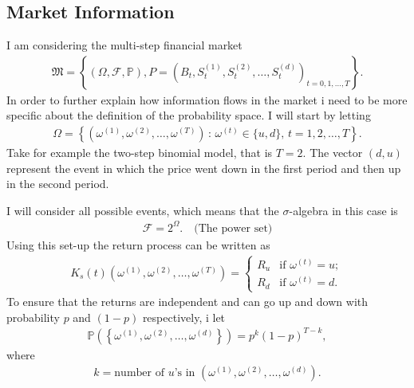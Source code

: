 \documentclass{article}
\theoremstyle{definition}
\numberwithin{equation}{section}
\begin{document}
\subsection{Market Information}
I am considering the multi-step financial market
\begin{align}
    \mathfrak{M} = \left\{
        (\Omega, \mathscr{F}, \mathbb{P}),
        P = \left(
            B_t, S_t^{(1)}, S_t^{(2)}, \ldots, S_t^{(d)}
        \right)_{t = 0,1, \ldots, T}
    \right\}.
\end{align}
In order to further explain how information flows in the market i need to be more specific about the definition of the probability space.
I will start by letting
\begin{align}
    \Omega = \left\{
        \left(
            \omega^{(1)}, \omega^{(2)}, \ldots, \omega^{(T)}
        \right)
        \, : \,
        \omega^{(t)} \in \{u,d\}, \, t = 1, 2, \ldots, T
    \right\}.
\end{align}
Take for example the two-step binomial model, that is $T = 2$.
The vector $(d,u)$ represent the event in which the price went down in the first period and then up in the second period.

I will consider all possible events, which means that the $\sigma$-algebra in this case is
\begin{align}
    \mathscr{F} = 2^{\Omega}. \quad \text{(The power set)}
\end{align}
Using this set-up the return process can be written as
\begin{align}
    K_s(t)(\omega^{(1)}, \omega^{(2)}, \ldots, \omega^{(T)}) =
    \begin{cases}
        R_u & \text{if } \omega^{(t)} = u; \\
        R_d & \text{if } \omega^{(t)} = d. 
    \end{cases}
\end{align}
To ensure that the returns are independent and can go up and down with probability $p$ and $(1-p)$ respectively, i let
\begin{align}
    \mathbb{P}\left(
        \left\{
            \omega^{(1)}, \omega^{(2)}, \ldots, \omega^{(d)}
        \right\}
    \right) =
    p^k(1 - p)^{T-k},
\end{align}
where
\begin{align}
    k = \text{number of $u$'s in } \left(\omega^{(1)}, \omega^{(2)}, \ldots, \omega^{(d)}\right). 
\end{align}
\end{document}
